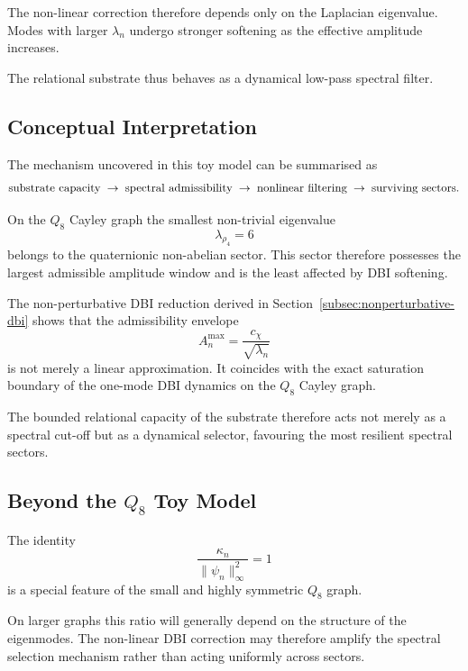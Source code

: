 \documentclass[11pt,a4paper]{article}
\begin{document}
      The non-linear correction therefore depends only on the Laplacian
      eigenvalue.
      Modes with larger $\lambda_n$ undergo stronger softening as the
      effective amplitude increases.

      The relational substrate thus behaves as a dynamical low-pass spectral
      filter.

    \subsection{Conceptual Interpretation}

      The mechanism uncovered in this toy model can be summarised as
      \[
        \text{sub\-strate capacity}
        \;\rightarrow\;
        \text{spectral admissibility}
        \;\rightarrow\;
        \text{nonlinear filtering}
        \;\rightarrow\;
        \text{surviving sectors}.
      \]

      On the $Q_8$ Cayley graph the smallest non-trivial eigenvalue
      \[
        \lambda_{\rho_4}=6
      \]
      belongs to the quaternionic non-abelian sector.
      This sector therefore possesses the largest admissible amplitude window
      and is the least affected by DBI softening.

      The non-perturbative DBI reduction derived in
      Section~\ref{subsec:nonperturbative-dbi} shows that the admissibility
      envelope
      \[
        A_n^{\max} = \frac{c_\chi}{\sqrt{\lambda_n}}
      \]
      is not merely a linear approximation.
      It coincides with the exact saturation boundary of the one-mode
      DBI dynamics on the $Q_8$ Cayley graph.

      The bounded relational capacity of the substrate therefore acts
      not merely as a spectral cut-off but as a dynamical selector,
      favouring the most resilient spectral sectors.

    \subsection{Beyond the $Q_8$ Toy Model}

      The identity
      \[
        \frac{\kappa_n}{\|\psi_n\|_\infty^2}=1
      \]
      is a special feature of the small and highly symmetric $Q_8$ graph.

      On larger graphs this ratio will generally depend on the structure of
      the eigenmodes.
      The non-linear DBI correction may therefore amplify the spectral
      selection mechanism rather than acting uniformly across sectors.
\end{document}
